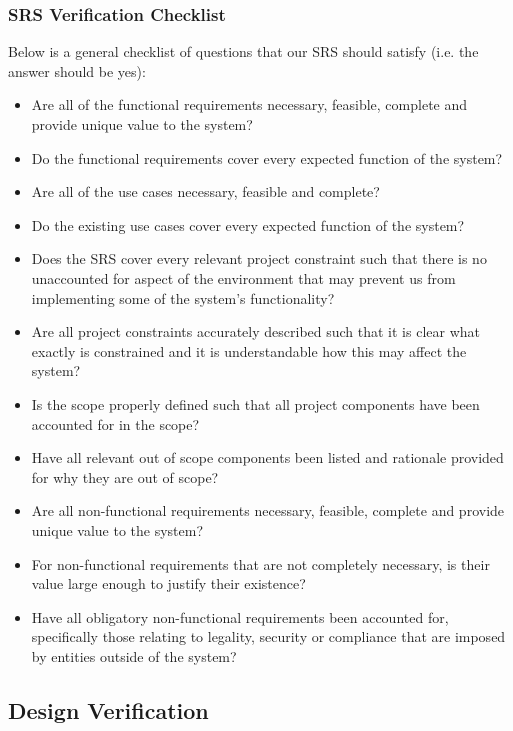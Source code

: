 \documentclass[12pt, titlepage]{article}
\begin{document}
\subsubsection{SRS Verification Checklist}

\par{Below is a general checklist of questions that our SRS should satisfy (i.e. the answer should be yes):}

\begin{itemize}

  \item{Are all of the functional requirements necessary, feasible, complete and provide unique value to the system?}
  \item{Do the functional requirements cover every expected function of the system?}
  \item{Are all of the use cases necessary, feasible and complete?}
  \item{Do the existing use cases cover every expected function of the system?}
  \item{Does the SRS cover every relevant project constraint such that there is no unaccounted for aspect of the environment that
  may prevent us from implementing some of the system's functionality?}
  \item{Are all project constraints accurately described such that it is clear what exactly is constrained and it is understandable how
  this may affect the system?}
  \item{Is the scope properly defined such that all project components have been accounted for in the scope?}
  \item{Have all relevant out of scope components been listed and rationale provided for why they are out of scope?}
  \item{Are all non-functional requirements necessary, feasible, complete and provide unique value to the system?}
  \item{For non-functional requirements that are not completely necessary, is their value large enough to justify their existence?}
  \item{Have all obligatory non-functional requirements been accounted for, specifically those relating to legality, security or compliance that
        are imposed by entities outside of the system?}

\end{itemize}

\subsection{Design Verification}
\end{document}
